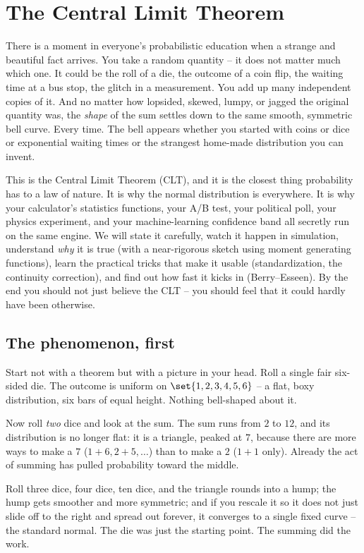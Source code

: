 \chapter{The Central Limit Theorem}

There is a moment in everyone's probabilistic education when a strange and beautiful
fact arrives. You take a random quantity -- it does not matter much which one. It could
be the roll of a die, the outcome of a coin flip, the waiting time at a bus stop, the
glitch in a measurement. You add up many independent copies of it. And no matter how
lopsided, skewed, lumpy, or jagged the original quantity was, the \emph{shape} of the
sum settles down to the same smooth, symmetric bell curve. Every time. The bell appears
whether you started with coins or dice or exponential waiting times or the strangest
home-made distribution you can invent.

This is the Central Limit Theorem (CLT), and it is the closest thing probability has to
a law of nature. It is why the normal distribution is everywhere. It is why your
calculator's statistics functions, your A/B test, your political poll, your physics
experiment, and your machine-learning confidence band all secretly run on the same
engine. We will state it carefully, watch it happen in simulation,
understand \emph{why} it is true (with a near-rigorous sketch using moment generating
functions), learn the practical tricks that make it usable (standardization, the
continuity correction), and find out how fast it kicks in (Berry--Esseen). By the end
you should not just believe the CLT -- you should feel that it could hardly have been
otherwise.

\section{The phenomenon, first}
\label{ch21:phenomenon}

Start not with a theorem but with a picture in your head. Roll a single fair
six-sided die. The outcome is uniform on $\set{1,2,3,4,5,6}$ -- a flat, boxy
distribution, six bars of equal height. Nothing bell-shaped about it.

Now roll \emph{two} dice and look at the sum. The sum runs from $2$ to $12$, and its
distribution is no longer flat: it is a triangle, peaked at $7$, because there are more
ways to make a $7$ ($1{+}6, 2{+}5, \dots$) than to make a $2$ ($1{+}1$ only). Already
the act of summing has pulled probability toward the middle.

Roll three dice, four dice, ten dice, and the triangle rounds into a hump; the hump
gets smoother and more symmetric; and if you rescale it so it does not just slide off to
the right and spread out forever, it converges to a single fixed curve -- the standard
normal. The die was just the starting point. The summing did the work.

